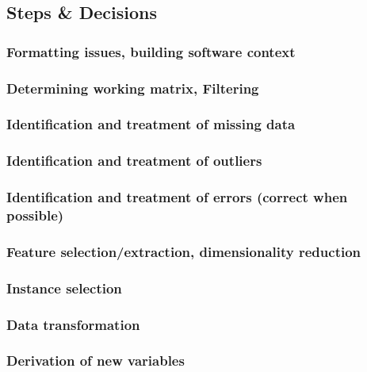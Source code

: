 
\subsection{Steps \& Decisions}%
\label{sub:steps-decisions}

\subsubsection{Formatting issues, building software context}
\subsubsection{Determining working matrix, Filtering}
\subsubsection{Identification and treatment of missing data}
\subsubsection{Identification and treatment of outliers}
\subsubsection{Identification and treatment of errors (correct when possible)}
\subsubsection{Feature selection/extraction, dimensionality reduction}
\subsubsection{Instance selection}
\subsubsection{Data transformation}
\subsubsection{Derivation of new variables}



